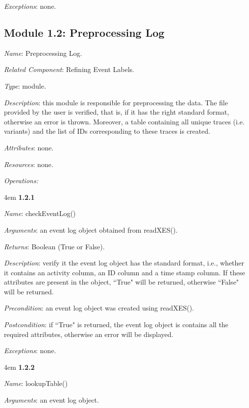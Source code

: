 \documentclass[notitlepage]{article}
\begin{document}
\begin{flushleft}
\textit{Exceptions}: none.
\par
\endgroup

\medskip

\subsection{Module 1.2: Preprocessing Log}
\textit{Name}: Preprocessing Log.

\textit{Related Component}: Refining Event Labels.

\textit{Type}: module.

\textit{Description}: this module is responsible for preprocessing the data. The file provided by the user is verified, that is, if it has the right standard format, otherwise an error is thrown. Moreover, a table containing all unique traces (i.e. variants) and the list of IDs corresponding to these traces is created.

\textit{Attributes}: none.

\textit{Resources}: none.

\textit{Operations: }
\medskip


\par
\begingroup
\leftskip4em
\textbf{1.2.1} 

\textit{Name}: checkEventLog()

\textit{Arguments}: an event log object obtained from readXES().

\textit{Returns}: Boolean (True or False).

\textit{Description}: verify it the event log object has the standard format, i.e., whether it contains an activity column, an ID column and a time stamp column. If these attributes are present in the object, ``True" will be returned, otherwise ``False" will be returned. 

\textit{Precondition}: an event log object was created using readXES().

\textit{Postcondition}: if ``True" is returned, the event log object is contains all the required attributes, otherwise an error will be displayed.

\textit{Exceptions}: none.
\par
\endgroup

\medskip

\par
\begingroup
\leftskip4em
\textbf{1.2.2}

\textit{Name}: lookupTable()

\textit{Arguments}: an event log object.


\end{flushleft}
\end{document}
